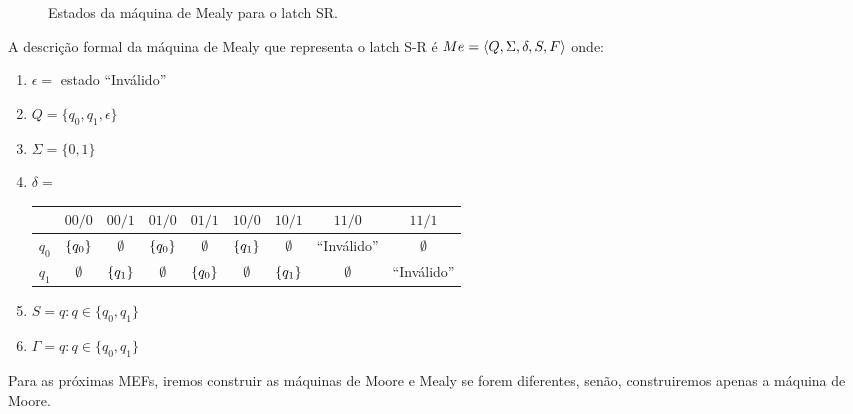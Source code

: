 \begin{figure}[ht]
\centering
{}
\caption{Estados da máquina de Mealy para o latch SR.}
\label{fig:mealySR}
\end{figure}



A descrição formal da máquina de Mealy que representa o latch S-R é
$Me=\<Q,\Sigma,\delta,S,F>$ onde:

\begin{enumerate}
\item $\epsilon=$ estado ``Inválido''
\item $Q = \{q_0, q_1,\epsilon\}$
\item $\Sigma = \{0,1\}$
\item $\delta=$\\

  \begin{center}
  \begin{tabular}[ht]{c|cccccccc}
    & $00/0$ & $00/1$ & $01/0$ & $01/1$ &  $10/0$ & $10/1$ & $11/0$ & $11/1$ \\\hline
    $q_0$ &  $\{q_0\}$ & $\emptyset$ & $\{q_0\}$ &
    $\emptyset$ &$\{q_1\}$ & $\emptyset$& ``Inválido'' & $\emptyset$ \\
    $q_1$ & $\emptyset$  &  $\{q_1\}$& $\emptyset$ &
    $\{q_0\}$ & $\emptyset$ & $\{q_1\}$ &  $\emptyset$&``Inválido''\\
  \end{tabular}
\end{center}

\item $S= q : q \in \{q_0, q_1\}$ 

\item $\Gamma= q : q \in \{q_0, q_1\}$ 

\end{enumerate}

Para as próximas MEFs, iremos construir as máquinas de Moore e Mealy
se forem diferentes, senão, construiremos apenas a máquina de Moore.
